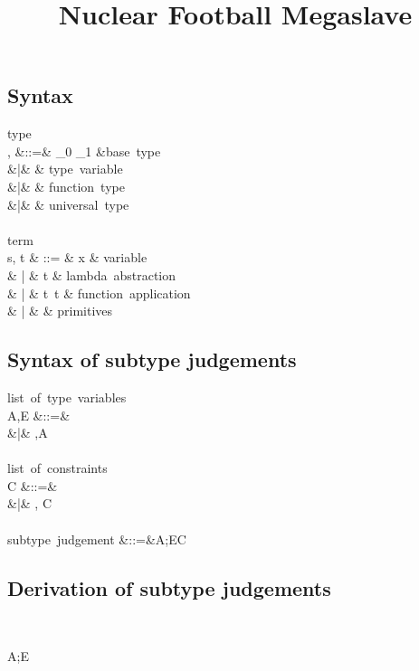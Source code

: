 \documentclass{amsart}
\title{Nuclear Football Megaslave}
\theoremstyle{definition}
\begin{document}
\maketitle
\tableofcontents

\subsection{Syntax}
\begin{syntax}
\mbox{type}\\
\sigma, \tau
&::=& \iota_0 \Or \iota_1 \Or \cdots &\mbox{base type}\\
&|& \alpha \Or \beta \Or \cdots & \mbox{type variable} \\
&|& \tau \rightarrow \tau & \mbox{function type} \\
&|& \All\alpha\tau & \mbox{universal type}
\\
\\
\mbox{term}\\
s, t & ::= & x & \mbox{variable} \\
& | & t  & \mbox{lambda abstraction} \\
& | & t~t & \mbox{function application} \\
& | & \cdots & \mbox{primitives}
\end{syntax}

\subsection{Syntax of subtype judgements}

\begin{syntax}
\mbox{list of type variables}\\
A,E
&::=& \emptyset \\
&|& \alpha,A
\\
\\
\mbox{list of constraints}\\
C
&::=& \emptyset \\
&|& \sigma \Sub \tau, C
\\
\\
\mbox{subtype judgement}
&::=&A;E\vdash C
\end{syntax}

\subsection{Derivation of subtype judgements}~

\infrule[S-vacuous]
{}
{A;E\vdash\emptyset}
\end{document}
